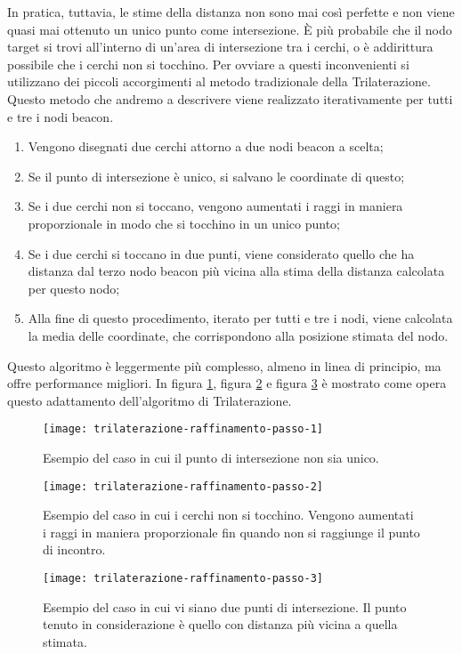 In pratica, tuttavia, le stime della distanza non sono mai così perfette e non viene quasi mai ottenuto un unico punto come intersezione. È più probabile che il nodo target si trovi all'interno di un’area di intersezione tra i cerchi, o è addirittura possibile che i cerchi non si tocchino. Per ovviare a questi inconvenienti si utilizzano dei piccoli accorgimenti al metodo tradizionale della Trilaterazione. Questo metodo che andremo a descrivere viene realizzato iterativamente per tutti e tre i nodi beacon.
\begin{enumerate}
	
	\item Vengono disegnati due cerchi attorno a due nodi beacon a scelta;
	
	\item Se il punto di intersezione è unico, si salvano le coordinate di questo;
	
	\item Se i due cerchi non si toccano, vengono aumentati i raggi in maniera proporzionale in modo che si tocchino in un unico punto;
	
	\item Se i due cerchi si toccano in due punti, viene considerato quello che ha distanza dal terzo nodo beacon più vicina alla stima della distanza calcolata per questo nodo;
	
	\item Alla fine di questo procedimento, iterato per tutti e tre i nodi, viene calcolata la media delle coordinate, che corrispondono alla posizione stimata del nodo.
	
\end{enumerate}
Questo algoritmo è leggermente più complesso, almeno in linea di principio, ma offre performance migliori. In figura \ref{fig:trilaterazione-raffinamento-passo-1}, figura \ref{fig:trilaterazione-raffinamento-passo-2} e figura \ref{fig:trilaterazione-raffinamento-passo-3} è mostrato come opera questo adattamento dell’algoritmo di Trilaterazione.

\begin{figure}[htp]
	\centering
	\texttt{[image: trilaterazione-raffinamento-passo-1]}
	\caption{Esempio del caso in cui il punto di intersezione non sia unico.}
	\label{fig:trilaterazione-raffinamento-passo-1}
\end{figure}

\begin{figure}[htp]
	\centering
	\texttt{[image: trilaterazione-raffinamento-passo-2]}
	\caption{Esempio del caso in cui i cerchi non si tocchino. Vengono aumentati i raggi in maniera proporzionale fin quando non si raggiunge il punto di incontro.}
	\label{fig:trilaterazione-raffinamento-passo-2}
\end{figure}

\begin{figure}[htp]
	\centering
	\texttt{[image: trilaterazione-raffinamento-passo-3]}
	\caption{Esempio del caso in cui vi siano due punti di intersezione. Il punto tenuto in considerazione è quello con distanza più vicina a quella stimata.}
	\label{fig:trilaterazione-raffinamento-passo-3}
\end{figure}